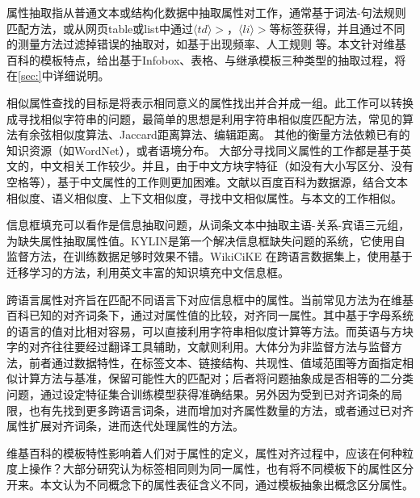 {\heiti 属性抽取}指从普通文本或结构化数据中抽取属性对工作，通常基于词法-句法规则匹配方法\cite{pacsca2007role,lee2013attribute}，或从网页table或list中通过$\langle td\rangle>$，$\langle li\rangle>$等标签获得\cite{crestan2010web}，并且通过不同的测量方法过滤掉错误的抽取对，如基于出现频率\cite{pacsca2007role}、人工规则\cite{lee2013attribute} 等。本文针对维基百科的模板特点，给出基于Infobox、表格、与继承模板三种类型的抽取过程，将在\ref{sec:}中详细说明。

{\heiti 相似属性查找}的目标是将表示相同意义的属性找出并合并成一组。此工作可以转换成寻找相似字符串的问题，最简单的思想是利用字符串相似度匹配方法，常见的算法有余弦相似度算法、Jaccard距离算法、编辑距离。
其他的衡量方法依赖已有的知识资源（如WordNet）\cite{yang2005measuring}，或者语境分布\cite{pantel2009web}。
大部分寻找同义属性的工作都是基于英文的，中文相关工作较少。并且，由于中文方块字特征（如没有大小写区分、没有空格等），基于中文属性的工作则更加困难。文献\cite{liu2014extracting}以百度百科为数据源，结合文本相似度、语义相似度、上下文相似度，寻找中文相似属性。与本文的工作相似。

{\heiti 信息框填充}可以看作是信息抽取问题，从词条文本中抽取主语-关系-宾语三元组，为缺失属性抽取属性值。KYLIN\cite{wu2007autonomously}是第一个解决信息框缺失问题的系统，它使用自监督方法，在训练数据足够时效果不错。WikiCiKE\cite{wang2013transfer} 在跨语言数据集上，使用基于迁移学习的方法，利用英文丰富的知识填充中文信息框。

{\heiti 跨语言属性对齐}旨在匹配不同语言下对应信息框中的属性。当前常见方法为在维基百科已知的对齐词条下，通过对属性值的比较，对齐同一属性。其中基于字母系统的语言的值对比相对容易，可以直接利用字符串相似度计算等方法\cite{bouma2009cross}。而英语与方块字的对齐往往要经过翻译工具辅助\cite{fu2009cross}，文献\cite{nguyen2011multilingual}则利用。大体分为非监督方法与监督方法，前者通过数据特性，在标签文本、链接结构、共现性、值域范围等方面指定相似计算方法与基准，保留可能性大的匹配对\cite{nguyen2011multilingual,lin2011unsupervised}；后者将问题抽象成是否相等的二分类问题\cite{adar2009information}，通过设定特征集合训练模型获得准确结果。另外因为受到已对齐词条的局限，也有先找到更多跨语言词条，进而增加对齐属性数量的方法\cite{rinser2013cross}，或者通过已对齐属性扩展对齐词条，进而迭代处理属性的方法\cite{nguyen2013slint}。

维基百科的模板特性影响着人们对于属性的定义，属性对齐过程中，应该在何种粒度上操作？大部分研究认为标签相同则为同一属性\cite{adar2009information,nguyen2011multilingual}，也有将不同模板下的属性区分开来\cite{bouma2009cross}。本文认为不同概念下的属性表征含义不同，通过模板抽象出概念区分属性。

